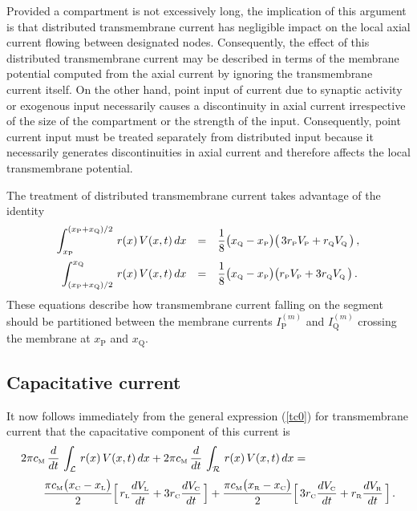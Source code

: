 Provided a compartment is not excessively long, the implication of
this argument is that distributed transmembrane current has
negligible impact on the local axial current flowing between
designated nodes. Consequently, the effect of this distributed
transmembrane current may be described in terms of the membrane
potential computed from the axial current by ignoring the
transmembrane current itself. On the other hand, point input of
current due to synaptic activity or exogenous input necessarily
causes a discontinuity in axial current irrespective of the size
of the compartment or the strength of the input. Consequently,
point current input must be treated separately from distributed
input because it necessarily generates discontinuities in axial
current and therefore affects the local transmembrane potential.

The treatment of distributed transmembrane current takes advantage
of the identity
\begin{equation}\label{gcm1}
\begin{array}{rcl}
\displaystyle\int_{x_{\mbox{\tiny P}}}^{(x_{\mbox{\tiny P}}+x_{\mbox{\tiny Q}})/2}\,r(x)\,V(x,t)\,dx & = &
\displaystyle\frac{1}{8}\big(x_{\mbox{\tiny Q}}-x_{\mbox{\tiny P}}\big)
\big(\,3r_{\mbox{\tiny P}} V_{\mbox{\tiny P}}+r_{\mbox{\tiny Q}} V_{\mbox{\tiny Q}}\,\big)\,,\\[12pt]
\displaystyle\int_{(x_{\mbox{\tiny P}}+x_{\mbox{\tiny Q}})/2}^{x_{\mbox{\tiny Q}}}\,r(x)\,V(x,t)\,dx & = &
\displaystyle\frac{1}{8}\big(x_{\mbox{\tiny Q}}-x_{\mbox{\tiny P}}\big)
\big(r_{\mbox{\tiny P}} V_{\mbox{\tiny P}}+3r_{\mbox{\tiny Q}}
V_{\mbox{\tiny Q}}\,\big)\,.
\end{array}
\end{equation}
These equations describe how transmembrane current falling on the
segment should be partitioned between the membrane currents
$I^{(m)}_\mathrm{P}$ and $I^{(m)}_\mathrm{Q}$ crossing the
membrane at $x_\mathrm{P}$ and $x_\mathrm{Q}$.

\subsection{Capacitative current}
It now follows
immediately from the general expression (\ref{tc0}) for
transmembrane current that the capacitative component of this
current is
\begin{equation}\label{gcm2}
\begin{array}{l}
\displaystyle2\pi c_{\mbox{\tiny M}}\,\frac{d}{dt}\,
\int_\mathcal{L}\, r(x)\,V(x,t)\,dx+2\pi c_{\mbox{\tiny M}}\,
\frac{d}{dt}\,\int_\mathcal{R}\, r(x)\,V(x,t)\,dx = \\[12pt]
\qquad\displaystyle\frac{\pi c_{\mbox{\tiny M}}\big(x_{\mbox{\tiny C}}-x_{\mbox{\tiny L}}\big)}{2}
\Big[\,r_{\mbox{\tiny L}}\frac{dV_{\mbox{\tiny L}}}{dt}+3r_{\mbox{\tiny C}}
\frac{dV_{\mbox{\tiny C}}}{dt}\,\Big]+
\frac{\pi c_{\mbox{\tiny M}}\big(x_{\mbox{\tiny R}}-x_{\mbox{\tiny C}}\big)}{2}
\Big[\,3r_{\mbox{\tiny C}}\frac{dV_{\mbox{\tiny C}}}{dt}+r_{\mbox{\tiny R}}
\frac{dV_{\mbox{\tiny R}}}{dt}\,\Big]\,.
\end{array}
\end{equation}

